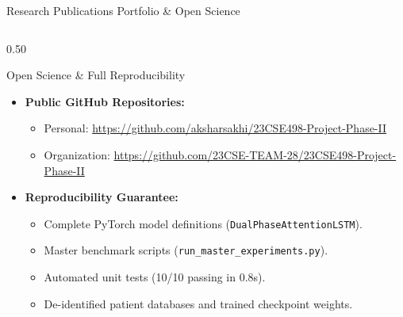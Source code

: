 \documentclass[aspectratio=169, 10pt]{beamer}
\begin{document}
\begin{frame}{Research Publications Portfolio \& Open Science}
\begin{columns}[t]
        \begin{column}{0.50\textwidth}
            \begin{alertblock}{Open Science \& Full Reproducibility}
                \scriptsize
                \begin{itemize}
                    \item \textbf{Public GitHub Repositories:}
                    \begin{itemize}
                        \tiny
                        \item Personal: \url{https://github.com/aksharsakhi/23CSE498-Project-Phase-II}
                        \item Organization: \url{https://github.com/23CSE-TEAM-28/23CSE498-Project-Phase-II}
                    \end{itemize}
                    \item \textbf{Reproducibility Guarantee:}
                    \begin{itemize}
                        \tiny
                        \item Complete PyTorch model definitions (\texttt{DualPhaseAttentionLSTM}).
                        \item Master benchmark scripts (\texttt{run\_master\_experiments.py}).
                        \item Automated unit tests (10/10 passing in 0.8s).
                        \item De-identified patient databases and trained checkpoint weights.
                    \end{itemize}
                \end{itemize}
            \end{alertblock}
        \end{column}
    \end{columns}
\end{frame}
\end{document}
